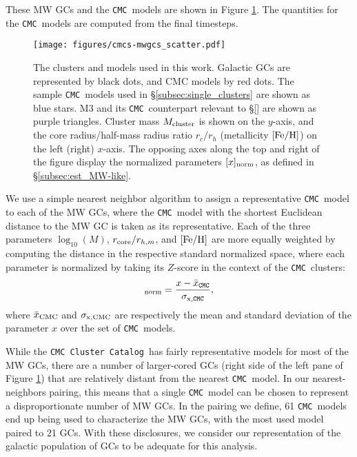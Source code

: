 \documentclass[twocolumn]{aastex631}
\newcommand{\CMC}{\texttt{CMC}}
\newcommand{\CMCcat}{\texttt{CMC Cluster Catalog}}
\begin{document}
These MW GCs and the \CMC\ models are shown in Figure \ref{fig:cmcs-mwgcs_scatter}.
The quantities for the \CMC\ models are computed from the final timesteps.

\begin{figure}
    \begin{centering}
        \texttt{[image: figures/cmcs-mwgcs\_scatter.pdf]}
        \caption{
        The clusters and models used in this work.
        Galactic GCs are represented by black dots, and CMC models by red dots.
        The sample \CMC\ models used in \S\ref{subsec:single_clusters} are shown as blue stars.
        M3 and its \CMC\ counterpart relevant to \S\ref{} are shown as purple triangles.
        Cluster mass $M_{\rm cluster}$ is shown on the $y$-axis, and the core radius/half-mass radius ratio $r_c/r_h$ (metallicity $[{\rm Fe/H}]$) on the left (right) $x$-axis.
        The opposing axes along the top and right of the figure display the normalized parameters $[x]_{\rm norm}$, as defined in \S\ref{subsec:est_MW-like}.
        }
        \label{fig:cmcs-mwgcs_scatter}
    \end{centering}
\end{figure}

We use a simple nearest neighbor algorithm to assign a representative \CMC\ model to each of the MW GCs, where the \CMC\ model with the shortest Euclidean distance to the MW GC is taken as its representative.
Each of the three parameters $\log_{10}(M)$, $r_{\rm core} / r_{h,m}$, and $[{\rm Fe/H}]$ are more equally weighted by computing the distance in the respective standard normalized space, where each parameter is normalized by taking its $Z$-score in the context of the \CMC\ clusters:
\begin{equation}
    [x]_{\rm norm} = \frac{x - \bar{x}_{\rm \CMC}}{\sigma_{\rm x, \CMC}},
\end{equation}
where $\bar{x}_{\rm CMC}$ and $\sigma_{\rm x,CMC}$ are respectively the mean and standard deviation of the parameter $x$ over the set of \CMC\ models.

While the \CMCcat\ has fairly representative models for most of the MW GCs, there are a number of larger-cored GCs (right side of the left pane of Figure \ref{fig:cmcs-mwgcs_scatter}) that are relatively distant from the nearest \CMC\ model.
In our nearest-neighbors pairing, this means that a single \CMC\ model can be chosen to represent a disproportionate number of MW GCs.
In the pairing we define, 61 \CMC\ models end up being used to characterize the MW GCs, with the most used model paired to 21 GCs.
With these disclosures, we consider our representation of the galactic population of GCs to be adequate for this analysis.
\end{document}
